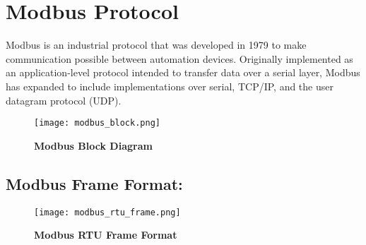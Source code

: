 \documentclass[12pt]{article}
\begin{document}
\section{Modbus Protocol}
Modbus is an industrial protocol that was developed in 1979 to make communication possible between automation devices. Originally implemented as an application-level protocol intended to transfer data over a serial layer, Modbus has expanded to include implementations over serial, TCP/IP, and the user datagram protocol (UDP).\\

 \begin{figure}[ht]
\centering
\texttt{[image: modbus\_block.png]}
\caption{\textbf{Modbus Block Diagram}}
\label{modbus_block}
\end{figure}

\pagebreak

\subsection*{Modbus Frame Format:}

 \begin{figure}[ht]
\centering
\texttt{[image: modbus\_rtu\_frame.png]}
\caption{\textbf{Modbus RTU Frame Format}}
\label{modbus_frame}
\end{figure}
\end{document}
